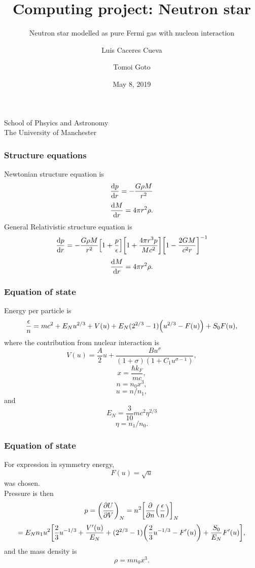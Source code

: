 \documentclass[hperref={pdfpagelabels=false}]{beamer}
\begin{document}
\title
{Computing project: Neutron star}

\subtitle{Neutron star modelled as pure Fermi gas with nucleon interaction}

\author
{Luis Caceres Cueva \and Tomoi Goto}

\institute
{
    School of Phsyics and Astronomy\\
    The University of Manchester
}
\date
{May 8, 2019}

\begin{frame}
 \titlepage
\end{frame}

\begin{frame}
 \frametitle{Structure equations}
 Newtonian structure equation is
\[\dv{p}{r}=-\frac{G\rho M}{r^{2}}\]
\[\dv{M}{r}=4\pi r^{2}\rho.\]
General Relativistic structure equation is
\[\dv{p}{r}=-\frac{G\rho M}{r^{2}}\qty[1+\frac{p}{\epsilon}]\qty[1+\frac{4\pi r^{3}p}{Mc^{2}}]\qty[1-\frac{2GM}{c^{2}r}]^{-1}\]
\[\dv{M}{r}=4\pi r^{2}\rho.\]
\end{frame}

\begin{frame}
 \frametitle{Equation of state}
 Energy per particle is
\[\frac{\epsilon}{n}=mc^{2}+E_{N}u^{2/3}+V(u)+E_{N}(2^{2/3}-1)\qty(u^{2/3}-F(u))+S_{0}F(u),\]
 where the contribution from nuclear interaction is
 \[V(u)=\frac{A}{2}u+\frac{Bu^{\sigma}}{(1+\sigma)(1+C_{1}u^{\sigma-1})},\]
\[x=\frac{\hbar k_{F}}{mc},\]
 \[n=n_{0}x^{3},\]
 \[u=n/n_{1},\]
 and
 \[E_{N}=\frac{3}{10}mc^{2}\eta^{2/3}\]
 \[\eta=n_{1}/n_{0}.\]
\end{frame}

\begin{frame}
\frametitle{Equation of state}
 For expression in symmetry energy,
 \[F(u)=\sqrt{u}\]
 was chosen.\\
 Pressure is then 
 \[p=\qty(\pdv{U}{V})_{N}=n^{2}\qty[\pdv{n}(\frac{\epsilon}{n})]_{N}\]
 \[=E_{N}n_{1}u^{2}\qty[\frac{2}{3}u^{-1/3}+\frac{V'(u)}{E_{N}}+(2^{2/3}-1)\qty(\frac{2}{3}u^{-1/3}-F'(u))+\frac{S_{0}}{E_{N}}F'(u)],\]
 and the mass density is
 \[\rho=mn_{0}x^{3}.\]
\end{frame}
\end{document}
